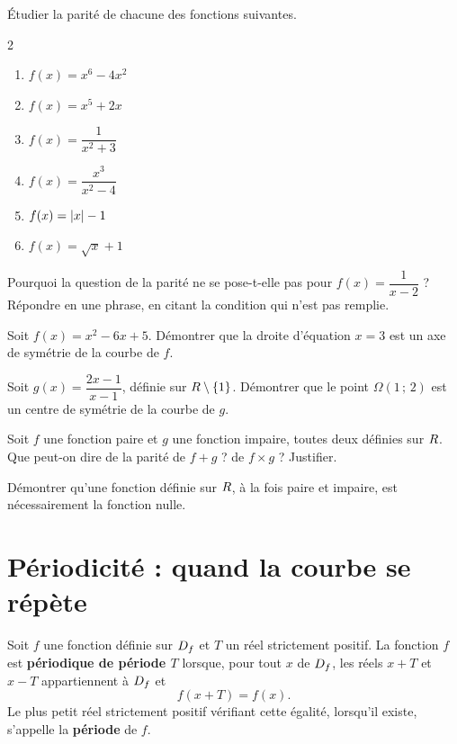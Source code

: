 \begin{entrainement}
\exo\label{t11s-c01-e18} Étudier la parité de chacune des fonctions suivantes.
\begin{multicols}{2}
\begin{enumerate}[label=\textbf{\alph*)}, leftmargin=1.6em, itemsep=0.1em]
  \item $f(x) = x^{6} - 4x^{2}$
  \item $f(x) = x^{5} + 2x$
  \item $f(x) = \dfrac{1}{x^{2}+3}$
  \item $f(x) = \dfrac{x^{3}}{x^{2}-4}$
  \item $f(x) = \left|x\right| - 1$
  \item $f(x) = \sqrt{x} + 1$
\end{enumerate}
\end{multicols}

\exo\label{t11s-c01-e19} Pourquoi la question de la parité ne se pose-t-elle pas pour
$f(x) = \dfrac{1}{x-2}$ ? Répondre en une phrase, en citant la condition qui
n'est pas remplie.

\exo\label{t11s-c01-e20} Soit $f(x) = x^{2} - 6x + 5$. Démontrer que la droite d'équation
$x = 3$ est un axe de symétrie de la courbe de $f$.

\exo\label{t11s-c01-e21} Soit $g(x) = \dfrac{2x-1}{x-1}$, définie sur $R \setminus \{1\}$.
Démontrer que le point $\Omega(1\,;\,2)$ est un centre de symétrie de la
courbe de $g$.

\exo\label{t11s-c01-e22} Soit $f$ une fonction paire et $g$ une fonction impaire, toutes deux
définies sur $R$. Que peut-on dire de la parité de $f + g$ ? de $f \times g$ ?
Justifier.

\exo\label{t11s-c01-e23} Démontrer qu'une fonction définie sur $R$, à la fois paire et impaire,
est nécessairement la fonction nulle.
\end{entrainement}

\section{Périodicité : quand la courbe se répète}

\begin{definition}
Soit $f$ une fonction définie sur $D_{f}$ et $T$ un réel strictement
positif. La fonction $f$ est \textbf{périodique de période $T$} lorsque, pour
tout $x$ de $D_{f}$, les réels $x+T$ et $x-T$ appartiennent à $D_{f}$ et
\[
  f(x+T) = f(x).
\]
Le plus petit réel strictement positif vérifiant cette égalité, lorsqu'il
existe, s'appelle la \textbf{période} de $f$.
\end{definition}


